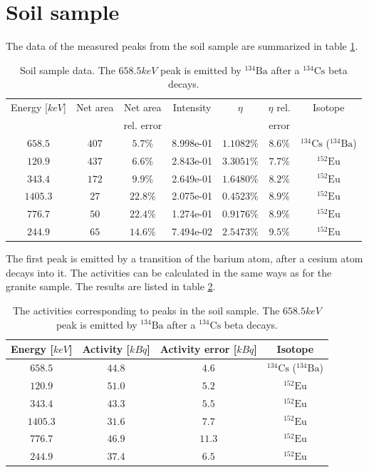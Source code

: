 \documentclass[pdftex,12pt,a4paper]{article}
\begin{document}
	\section{Soil sample}
		The data of the measured peaks from the soil sample are summarized in table \ref{soildata}.
		\begin{table}[H]
		\centering
		\begin{tabular}{|c|c|c|c|c|c|c|}
			\hline
			Energy [$keV$] & Net area & Net area   & Intensity & $\eta$ & $\eta$ rel. & Isotope \\
			               &          & rel. error &           &        & error       &         \\
			\hline
            $658.5$ & $407$ & $5.7\%$ & 8.998e-01 & $1.1082\%$ & $8.6\%$ & $^{134}\text{Cs}$ ($^{134}\text{Ba}$) \\
            $120.9$ & $437$ & $6.6\%$ & 2.843e-01 & $3.3051\%$ & $7.7\%$ & $^{152}\text{Eu}$ \\
            $343.4$ & $172$ & $9.9\%$ & 2.649e-01 & $1.6480\%$ & $8.2\%$ & $^{152}\text{Eu}$ \\
            $1405.3$ & $27$ & $22.8\%$ & 2.075e-01 & $0.4523\%$ & $8.9\%$ & $^{152}\text{Eu}$ \\
            $776.7$ & $50$ & $22.4\%$ & 1.274e-01 & $0.9176\%$ & $8.9\%$ & $^{152}\text{Eu}$ \\
            $244.9$ & $65$ & $14.6\%$ & 7.494e-02 & $2.5473\%$ & $9.5\%$ & $^{152}\text{Eu}$ \\
			\hline
		\end{tabular}
		\caption{Soil sample data. The $658.5keV$ peak is emitted by $^{134}\text{Ba}$ after a $^{134}\text{Cs}$ beta decays.}
		\label{soildata}
		\end{table}
		The first peak is emitted by a transition of the barium atom, after a cesium atom decays into it. The activities can be calculated in the same ways as for the granite sample. The results are listed in table \ref{soilpeaks}.
		\begin{table}[H]
		\centering
		\begin{tabular}{|c|c|c|c|}
			\hline
			Energy [$keV$] & Activity [$kBq$]& Activity error [$kBq$]& Isotope \\
			\hline
            $658.5$ & $44.8$ & $4.6$ & $^{134}\text{Cs}$ ($^{134}\text{Ba}$) \\
            $120.9$ & $51.0$ & $5.2$ & $^{152}\text{Eu}$ \\
            $343.4$ & $43.3$ & $5.5$ & $^{152}\text{Eu}$ \\
            $1405.3$ & $31.6$ & $7.7$ & $^{152}\text{Eu}$ \\
            $776.7$ & $46.9$ & $11.3$ & $^{152}\text{Eu}$ \\
            $244.9$ & $37.4$ & $6.5$ & $^{152}\text{Eu}$ \\
            \hline
		\end{tabular}
		\caption{The activities corresponding to peaks in the soil sample. The $658.5keV$ peak is emitted by $^{134}\text{Ba}$ after a $^{134}\text{Cs}$ beta decays.}
		\label{soilpeaks}
		\end{table}
\end{document}
